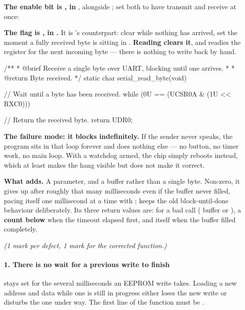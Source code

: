 \textbf{The enable bit is , in }, alongside ; set both to have
transmit and receive at once:  

\textbf{The flag is , in .} It is 's counterpart: clear while
nothing has arrived, set the moment a fully received byte is sitting in .
\textbf{Reading  clears it}, and readies the register for the next incoming byte ---
there is nothing to write back by hand. 

\begin{ccode}
/**
 * @brief Receive a single byte over UART, blocking until one arrives.
 *
 * @return Byte received.
 */
static char serial_read_byte(void)
{
    // Wait until a byte has been received.
    while (0U == (UCSR0A & (1U << RXC0))) {}

    // Return the received byte.
    return UDR0;
}
\end{ccode}

\textbf{The failure mode: it blocks indefinitely.} If the sender never speaks, the program sits in
that loop forever and does nothing else --- no button, no timer work, no main loop. With a watchdog
armed, the chip simply reboots instead, which at least makes the hang visible but does not make it
correct. 

\textbf{What  adds.} A  parameter, and a buffer rather than a single
byte. Non-zero, it gives up after roughly that many milliseconds even if the buffer never filled,
pacing itself one millisecond at a time with ;  keeps the old
block-until-done behaviour deliberately. Its three return values are: \textbf{} for a bad
call ( buffer or ), a \textbf{count below } when the
timeout elapsed first, and \textbf{} itself when the buffer filled completely.


\textit{(1 mark per defect, 1 mark for the corrected function.)}

\paragraph{1. There is no wait for a previous write to finish}
 stays set for the several milliseconds an EEPROM write takes. Loading a new address and
data while one is still in progress either loses the new write or disturbs the one under way. The
first line of the function must be .

